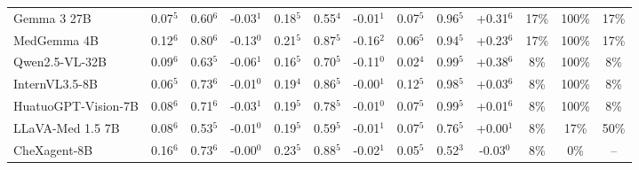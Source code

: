 \documentclass[11pt]{article}
\begin{document}
\begin{table}[t]
{\begin{tabular}{l@{\hspace{3pt}}ccc@{\hspace{4pt}}ccc@{\hspace{4pt}}ccc@{\hspace{4pt}}ccc}
Gemma 3 27B & \cellcolor{cfSage2}0.07$^{5}$ & \cellcolor{cfSage2}0.60$^{6}$ & \cellcolor{cfSlate2}-0.03$^{1}$ & \cellcolor{cfSage3}0.18$^{5}$ & \cellcolor{cfSage1}0.55$^{4}$ & \cellcolor{cfSlate1}-0.01$^{1}$ & \cellcolor{cfSage2}0.07$^{5}$ & \cellcolor{cfSage4}0.96$^{5}$ & \cellcolor{cfTerra4}+0.31$^{6}$ & \cellcolor{cfTerra3}17\% & \cellcolor{cfTerra4}100\% & 17\% \\
MedGemma 4B & \cellcolor{cfSage3}0.12$^{6}$ & \cellcolor{cfSage3}0.80$^{6}$ & \cellcolor{cfSlate3}-0.13$^{0}$ & \cellcolor{cfSage4}0.21$^{5}$ & \cellcolor{cfSage3}0.87$^{5}$ & \cellcolor{cfSlate3}-0.16$^{2}$ & \cellcolor{cfSage2}0.06$^{5}$ & \cellcolor{cfSage4}0.94$^{5}$ & \cellcolor{cfTerra3}+0.23$^{6}$ & \cellcolor{cfTerra3}17\% & \cellcolor{cfTerra4}100\% & 17\% \\
Qwen2.5-VL-32B & \cellcolor{cfSage2}0.09$^{6}$ & \cellcolor{cfSage2}0.63$^{5}$ & \cellcolor{cfSlate2}-0.06$^{1}$ & \cellcolor{cfSage3}0.16$^{5}$ & \cellcolor{cfSage2}0.70$^{5}$ & \cellcolor{cfSlate3}-0.11$^{0}$ & \cellcolor{cfSage1}0.02$^{4}$ & \cellcolor{cfSage4}0.99$^{5}$ & \cellcolor{cfTerra4}+0.38$^{6}$ & \cellcolor{cfTerra2}8\% & \cellcolor{cfTerra4}100\% & 8\% \\
InternVL3.5-8B & \cellcolor{cfSage2}0.06$^{5}$ & \cellcolor{cfSage2}0.73$^{6}$ & \cellcolor{cfSlate1}-0.01$^{0}$ & \cellcolor{cfSage3}0.19$^{4}$ & \cellcolor{cfSage3}0.86$^{5}$ & \cellcolor{cfSlate1}-0.00$^{1}$ & \cellcolor{cfSage2}0.12$^{5}$ & \cellcolor{cfSage4}0.98$^{5}$ & \cellcolor{cfTerra2}+0.03$^{6}$ & \cellcolor{cfTerra2}8\% & \cellcolor{cfTerra4}100\% & 8\% \\
HuatuoGPT-Vision-7B & \cellcolor{cfSage2}0.08$^{6}$ & \cellcolor{cfSage2}0.71$^{6}$ & \cellcolor{cfSlate2}-0.03$^{1}$ & \cellcolor{cfSage3}0.19$^{5}$ & \cellcolor{cfSage3}0.78$^{5}$ & \cellcolor{cfSlate1}-0.01$^{0}$ & \cellcolor{cfSage2}0.07$^{5}$ & \cellcolor{cfSage4}0.99$^{5}$ & \cellcolor{cfTerra1}+0.01$^{6}$ & \cellcolor{cfTerra2}8\% & \cellcolor{cfTerra4}100\% & 8\% \\
LLaVA-Med 1.5 7B & \cellcolor{cfSage2}0.08$^{6}$ & \cellcolor{cfSage1}0.53$^{5}$ & \cellcolor{cfSlate1}-0.01$^{0}$ & \cellcolor{cfSage3}0.19$^{5}$ & \cellcolor{cfSage1}0.59$^{5}$ & \cellcolor{cfSlate1}-0.01$^{1}$ & \cellcolor{cfSage2}0.07$^{5}$ & \cellcolor{cfSage3}0.76$^{5}$ & \cellcolor{cfTerra1}+0.00$^{1}$ & \cellcolor{cfTerra2}8\% & \cellcolor{cfTerra2}17\% & 50\% \\
CheXagent-8B & \cellcolor{cfSage3}0.16$^{6}$ & \cellcolor{cfSage2}0.73$^{6}$ & \cellcolor{cfSlate1}-0.00$^{0}$ & \cellcolor{cfSage4}0.23$^{5}$ & \cellcolor{cfSage3}0.88$^{5}$ & \cellcolor{cfSlate1}-0.02$^{1}$ & \cellcolor{cfSage2}0.05$^{5}$ & \cellcolor{cfSage1}0.52$^{3}$ & \cellcolor{cfSlate2}-0.03$^{0}$ & \cellcolor{cfTerra2}8\% & \cellcolor{cfTerra1}0\% & -- \\

\end{tabular}}
\end{table}
\end{document}
